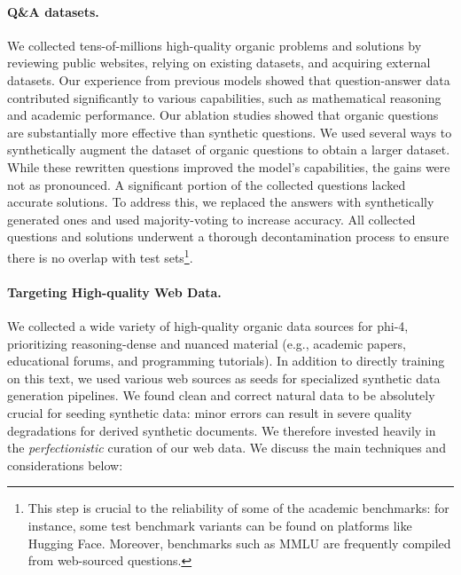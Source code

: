 \documentclass[11pt]{article}
\newcommand{\modelwithoutspace}{\textsf{phi-4}}
\begin{document}
\paragraph{Q\&A datasets.}
We collected tens-of-millions high-quality organic problems and solutions by reviewing public websites, relying on existing datasets, and acquiring external datasets. Our experience from previous models showed that question-answer data contributed significantly to various capabilities, such as mathematical reasoning and academic performance. Our ablation studies showed that organic questions are substantially more effective than synthetic questions. We used several ways to synthetically augment the dataset of organic questions to obtain a larger dataset. While these rewritten questions improved the model’s capabilities, the gains were not as pronounced.
A significant portion of the collected questions lacked accurate solutions. To address this, we replaced the answers with synthetically generated ones and used majority-voting to increase accuracy.
All collected questions and solutions underwent a thorough decontamination process to ensure there is no overlap with test sets\footnote{This step is crucial to the reliability of some of the academic benchmarks: for instance, some test benchmark variants can be found on platforms like Hugging Face. Moreover, benchmarks such as MMLU are frequently compiled from web-sourced questions.}.

\paragraph{Targeting High-quality Web Data.}\label{sec:web_data}
We collected a wide variety of high-quality organic data sources for \modelwithoutspace, prioritizing reasoning-dense and nuanced material (e.g., academic papers, educational forums, and programming tutorials). In addition to directly training on this text, we used various web sources as seeds for specialized synthetic data generation pipelines. We found clean and correct natural data to be absolutely crucial for seeding synthetic data: minor errors can result in severe quality degradations for derived synthetic documents. We therefore invested heavily in the \textit{perfectionistic} curation of our web data. We discuss the main techniques and considerations below:
\end{document}
